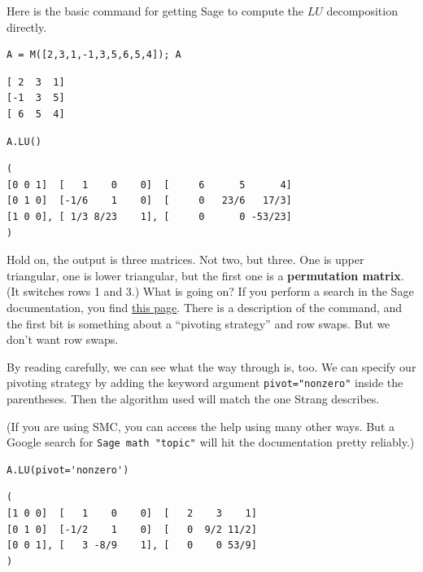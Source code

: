 \documentclass[10pt,]{book}
\newcommand{\terminology}[1]{\textbf{#1}}
\theoremstyle{plain}
\theoremstyle{definition}
\numberwithin{equation}{section}
\begin{document}
        Here is the basic command for getting Sage to compute the \(LU\)
        decomposition directly.
\begin{lstlisting}[style=sageinput]
A = M([2,3,1,-1,3,5,6,5,4]); A
\end{lstlisting}
\begin{lstlisting}[style=sageoutput]
[ 2  3  1]
[-1  3  5]
[ 6  5  4]
\end{lstlisting}
\begin{lstlisting}[style=sageinput]
A.LU()
\end{lstlisting}
\begin{lstlisting}[style=sageoutput]
(
[0 0 1]  [   1    0    0]  [     6      5      4]
[0 1 0]  [-1/6    1    0]  [     0   23/6   17/3]
[1 0 0], [ 1/3 8/23    1], [     0      0 -53/23]
)
\end{lstlisting}
\par

        Hold on, the output is three matrices. Not two, but three. One is upper
        triangular, one is lower triangular, but the first one is a
        \terminology{permutation matrix}. (It switches rows 1 and 3.) What is
        going on? If you perform a search in the Sage documentation, you find
        \href{http://www.sagemath.org/doc/reference/matrices/sage/matrix/matrix2.html}{this page}.
        There is a description of the command, and the first bit is something about
        a ``pivoting strategy'' and row swaps. But we don't want row swaps.
\par

        By reading carefully, we can see what the way through is, too. We can
        specify our pivoting strategy by adding the keyword argument
        \verb?pivot="nonzero"? inside the parentheses. Then the algorithm used
        will match the one Strang describes.
\par
(If you are using SMC, you can access the help using many other ways.
        But a Google search for \verb?Sage math "topic"? will hit the documentation
        pretty reliably.)
\begin{lstlisting}[style=sageinput]
A.LU(pivot='nonzero')
\end{lstlisting}
\begin{lstlisting}[style=sageoutput]
(
[1 0 0]  [   1    0    0]  [   2    3    1]
[0 1 0]  [-1/2    1    0]  [   0  9/2 11/2]
[0 0 1], [   3 -8/9    1], [   0    0 53/9]
)
\end{lstlisting}
\par
\end{document}
